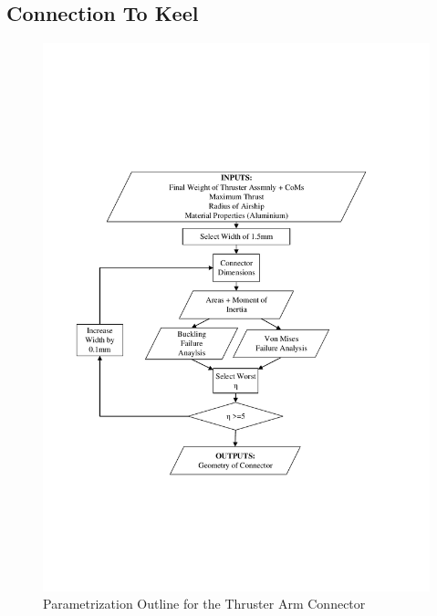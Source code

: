\documentclass[../main.tex]{subfiles}
\begin{document}
\subsection{Connection To Keel} \label{connector}
\begin{figure}[H]
	\centering
	\includegraphics[width=.9\linewidth]{img/paramaterization/connector.pdf}
	\caption{Parametrization Outline for the Thruster Arm Connector}
	\label{fig:connectorParametrization}
\end{figure}
\end{document}
